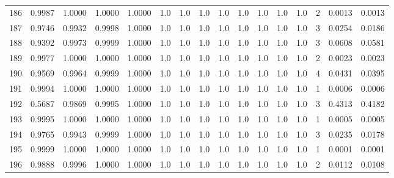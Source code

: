 \begin{tabular}{lrrrrrrrrrrrrrrr}
186 &      0.9987 &  1.0000 &  1.0000 &  1.0000 &     1.0 &     1.0 &     1.0 &     1.0 &     1.0 &     1.0 &      1.0 &        1.0 &      2 &                    0.0013 &                     0.0013 \\
187 &      0.9746 &  0.9932 &  0.9998 &  1.0000 &     1.0 &     1.0 &     1.0 &     1.0 &     1.0 &     1.0 &      1.0 &        1.0 &      3 &                    0.0254 &                     0.0186 \\
188 &      0.9392 &  0.9973 &  0.9999 &  1.0000 &     1.0 &     1.0 &     1.0 &     1.0 &     1.0 &     1.0 &      1.0 &        1.0 &      3 &                    0.0608 &                     0.0581 \\
189 &      0.9977 &  1.0000 &  1.0000 &  1.0000 &     1.0 &     1.0 &     1.0 &     1.0 &     1.0 &     1.0 &      1.0 &        1.0 &      2 &                    0.0023 &                     0.0023 \\
190 &      0.9569 &  0.9964 &  0.9999 &  1.0000 &     1.0 &     1.0 &     1.0 &     1.0 &     1.0 &     1.0 &      1.0 &        1.0 &      4 &                    0.0431 &                     0.0395 \\
191 &      0.9994 &  1.0000 &  1.0000 &  1.0000 &     1.0 &     1.0 &     1.0 &     1.0 &     1.0 &     1.0 &      1.0 &        1.0 &      1 &                    0.0006 &                     0.0006 \\
192 &      0.5687 &  0.9869 &  0.9995 &  1.0000 &     1.0 &     1.0 &     1.0 &     1.0 &     1.0 &     1.0 &      1.0 &        1.0 &      3 &                    0.4313 &                     0.4182 \\
193 &      0.9995 &  1.0000 &  1.0000 &  1.0000 &     1.0 &     1.0 &     1.0 &     1.0 &     1.0 &     1.0 &      1.0 &        1.0 &      1 &                    0.0005 &                     0.0005 \\
194 &      0.9765 &  0.9943 &  0.9999 &  1.0000 &     1.0 &     1.0 &     1.0 &     1.0 &     1.0 &     1.0 &      1.0 &        1.0 &      3 &                    0.0235 &                     0.0178 \\
195 &      0.9999 &  1.0000 &  1.0000 &  1.0000 &     1.0 &     1.0 &     1.0 &     1.0 &     1.0 &     1.0 &      1.0 &        1.0 &      1 &                    0.0001 &                     0.0001 \\
196 &      0.9888 &  0.9996 &  1.0000 &  1.0000 &     1.0 &     1.0 &     1.0 &     1.0 &     1.0 &     1.0 &      1.0 &        1.0 &      2 &                    0.0112 &                     0.0108 \\

\end{tabular}
